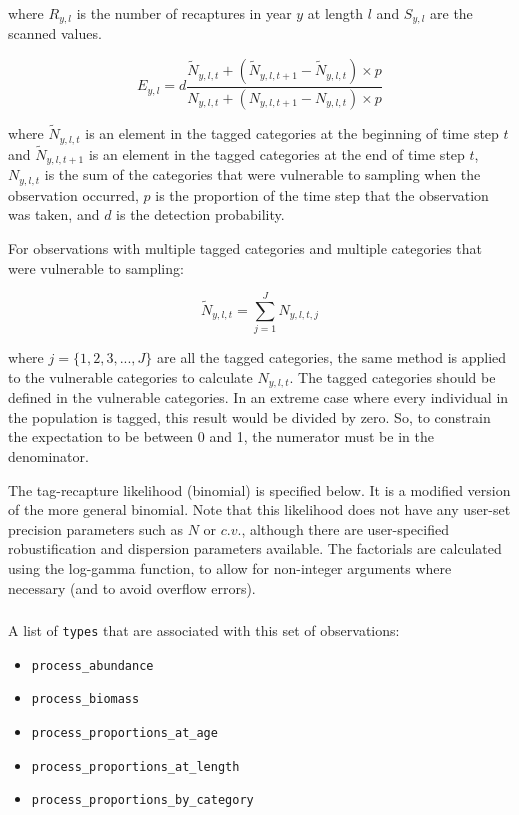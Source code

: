 where $R_{y,l}$ is the number of recaptures in year $y$ at length $l$ and $S_{y,l}$ are the scanned values.

\begin{equation}
E_{y,l} = d \frac{\tilde{N}_{y,l,t} +  (\tilde{N}_{y,l,t + 1} - \tilde{N}_{y,l,t}) \times p}
{N_{y,l,t} + (N_{y,l,t+1} - N_{y,l,t}) \times p}
\end{equation}

where $\tilde{N}_{y,l,t}$ is an element in the tagged categories at the beginning of time step $t$ and $\tilde{N}_{y,l,t + 1}$ is an element in the tagged categories at the end of time step $t$, $N_{y,l,t}$ is the sum of the categories that were vulnerable to sampling when the observation occurred, $p$ is the proportion of the time step that the observation was taken, and $d$ is the detection probability.

For observations with multiple tagged categories and multiple categories that were vulnerable to sampling:

\begin{equation}
	\tilde{N}_{y,l,t} = \sum_{j = 1}^{J} N_{y,l,t,j}
\end{equation}

where $j = \{1,2,3,...,J\}$  are all the tagged categories, the same method is applied to the vulnerable categories to calculate $N_{y,l,t}$. The tagged categories should be defined in the vulnerable categories. In an extreme case where every individual in the population is tagged, this result would be divided by zero. So, to constrain the expectation to be between 0 and 1, the numerator must be in the denominator.

The tag-recapture likelihood (binomial) is specified below. It is a modified version of the more general binomial. Note that this likelihood does not have any user-set precision parameters such as $N$ or $c.v.$, although there are user-specified robustification and dispersion parameters available. The factorials are calculated using the log-gamma function, to allow for non-integer arguments where necessary (and to avoid overflow errors).

\subsubsection{}

A list of \texttt{types} that are associated with this set of observations:

\begin{itemize}
	\item \texttt{process\_abundance}
	\item \texttt{process\_biomass}
	\item \texttt{process\_proportions\_at\_age}
	\item \texttt{process\_proportions\_at\_length}
	\item \texttt{process\_proportions\_by\_category}
\end{itemize}

